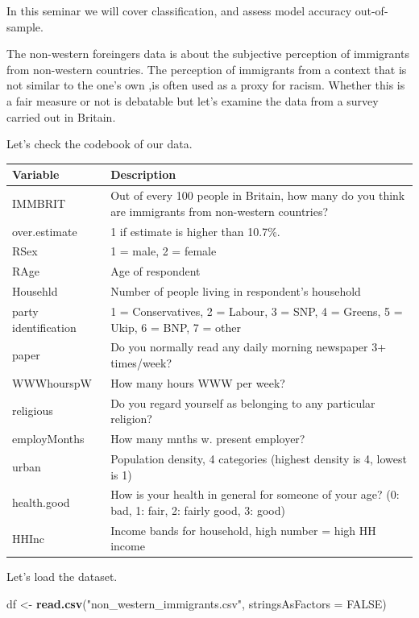 \documentclass[]{article}
\newenvironment{Shaded}{\begin{snugshade}}{\end{snugshade}}
\newcommand{\DataTypeTok}[1]{\textcolor[rgb]{0.13,0.29,0.53}{#1}}
\newcommand{\KeywordTok}[1]{\textcolor[rgb]{0.13,0.29,0.53}{\textbf{#1}}}
\newcommand{\NormalTok}[1]{#1}
\newcommand{\OtherTok}[1]{\textcolor[rgb]{0.56,0.35,0.01}{#1}}
\newcommand{\StringTok}[1]{\textcolor[rgb]{0.31,0.60,0.02}{#1}}
\begin{document}
In this seminar we will cover classification, and assess model accuracy out-of-sample.

The non-western foreingers data is about the subjective perception of immigrants from non-western countries. The perception of immigrants from a context that is not similar to the one's own ,is often used as a proxy for racism. Whether this is a fair measure or not is debatable but let's examine the data from a survey carried out in Britain.

Let's check the codebook of our data.

\begin{tabular}{l|l}
\hline
Variable & Description\\
\hline
IMMBRIT & Out of every 100 people in Britain, how many do you think are immigrants from non-western countries?\\
\hline
over.estimate & 1 if estimate is higher than 10.7\%.\\
\hline
RSex & 1 = male, 2 = female\\
\hline
RAge & Age of respondent\\
\hline
Househld & Number of people living in respondent's household\\
\hline
party identification & 1 = Conservatives, 2 = Labour, 3 = SNP, 4 = Greens, 5 = Ukip, 6 = BNP, 7 = other\\
\hline
paper & Do you normally read any daily morning newspaper 3+ times/week?\\
\hline
WWWhourspW & How many hours WWW per week?\\
\hline
religious & Do you regard yourself as belonging to any particular religion?\\
\hline
employMonths & How many mnths w. present employer?\\
\hline
urban & Population density, 4 categories (highest density is 4, lowest is 1)\\
\hline
health.good & How is your health in general for someone of your age? (0: bad, 1: fair, 2: fairly good, 3: good)\\
\hline
HHInc & Income bands for household, high number = high HH income\\
\hline
\end{tabular}

Let's load the dataset.

\begin{Shaded}
\begin{Highlighting}[]
\NormalTok{df <-}\StringTok{ }\KeywordTok{read.csv}\NormalTok{(}\StringTok{"non_western_immigrants.csv"}\NormalTok{, }\DataTypeTok{stringsAsFactors =} \OtherTok{FALSE}\NormalTok{)}
\end{Highlighting}
\end{Shaded}
\end{document}
